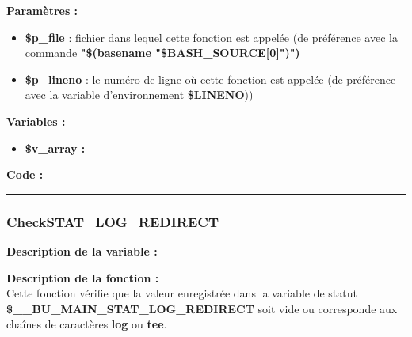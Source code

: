 \documentclass[a4paper,10pt]{article}
\begin{document}
\begin{justify}
    \textbf{Paramètres :}
    \begin{itemize}
        \item \color{orange}\textbf{\$p\_file}\color{white} : fichier dans lequel cette fonction est appelée (de préférence avec la commande \textbf{"\$(\color{gray}basename \color{white}"\color{orange}\$BASH\_SOURCE[0]\color{white}")")}\\

        \item \color{orange}\textbf{\$p\_lineno}\color{white} : le numéro de ligne où cette fonction est appelée (de préférence avec la variable d'environnement \textbf{\color{orange}\$LINENO}))
    \end{itemize}
\end{justify}

\begin{justify}
    \textbf{Variables :}

    \begin{itemize}
        \item \textbf{\color{orange}\$v\_array\color{white} :}
    \end{itemize}
\end{justify}

\begin{justify}
    \textbf{Code :}
\end{justify}



\color{blue}\par\noindent\rule{\textwidth}{0.4pt}\color{white}

\color{blue}
\subsubsection{CheckSTAT\_LOG\_REDIRECT}\color{white}

\begin{justify}
    \textbf{Description de la variable :}\\

\end{justify}

\begin{justify}
    \textbf{Description de la fonction :}\\
    Cette fonction vérifie que la valeur enregistrée dans la variable de statut \textbf{\color{orange}\$\_\_BU\_MAIN\_STAT\_LOG\_REDIRECT} soit vide ou corresponde aux chaînes de caractères \textbf{log} ou \textbf{tee}.
\end{justify}
\end{document}
